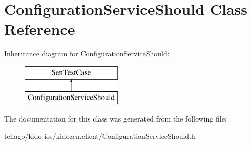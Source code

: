\hypertarget{interface_configuration_service_should}{\section{Configuration\-Service\-Should Class Reference}
\label{interface_configuration_service_should}
}
Inheritance diagram for Configuration\-Service\-Should\-:\begin{figure}[H]
\begin{center}
\leavevmode
\includegraphics[height=2.000000cm]{interface_configuration_service_should}
\end{center}
\end{figure}


The documentation for this class was generated from the following file\-:\begin{DoxyCompactItemize}
\item 
tellago/kido-\/ios/kidozen.\-client/Configuration\-Service\-Should.\-h\end{DoxyCompactItemize}
